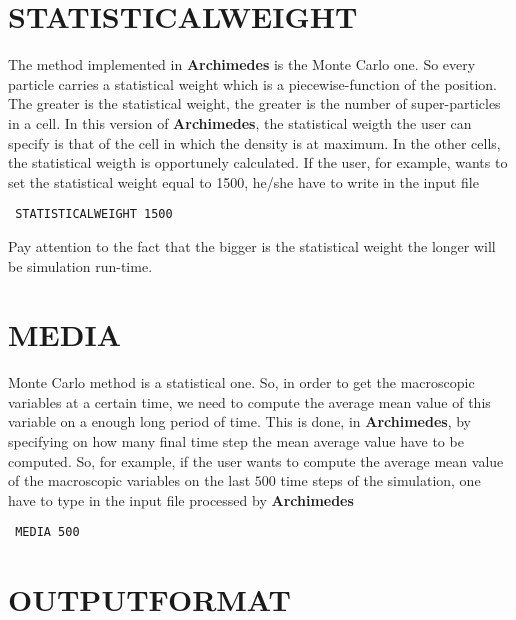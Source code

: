 \documentclass[12pt]{book}
\begin{document}
\section{STATISTICALWEIGHT}

The method implemented in \textbf{Archimedes} is the Monte Carlo one. So every particle carries a statistical weight which is a piecewise-function of the position. The greater is the statistical weight, the greater is the number of super-particles in a cell. In this version of \textbf{Archimedes}, the statistical weigth the user can specify is that of the cell in which the density is at maximum. In the other cells, the statistical weigth is opportunely calculated. If the user, for example, wants to set the statistical weight equal to 1500, he/she have to write in the input file
\begin{verbatim}
 STATISTICALWEIGHT 1500
\end{verbatim}
Pay attention to the fact that the bigger is the statistical weight the longer will be simulation run-time.

\section{MEDIA}

Monte Carlo method is a statistical one. So, in order to get the macroscopic variables at a certain time, we need to compute the average mean value of this variable on a enough long period of time. This is done, in \textbf{Archimedes}, by specifying on how many final time step the mean average value have to be computed. So, for example, if the user wants to compute the average mean value of the macroscopic variables on the last $500$ time steps of the simulation, one have to type in the input file processed by \textbf{Archimedes}
\begin{verbatim}
 MEDIA 500
\end{verbatim}

\section{OUTPUTFORMAT}
\end{document}
